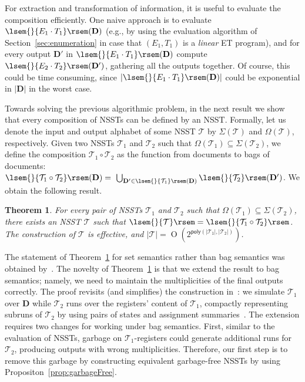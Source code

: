 \documentclass[
a4paper
]{article}
\theoremstyle{plain}
\newtheorem{theorem}{Theorem}[section]
\theoremstyle{definition}
\theoremstyle{remark}
\newcommand{\doc}{\ensuremath{\mathbf{D}}}
\newcommand{\nsst}{\mathcal{T}}
\newcommand{\sem}[1]{{\lsem{}{#1}\rsem}}
\DeclareMathOperator{\bigo}{O}
\begin{document}
For extraction and transformation of information, it is useful to evaluate the composition efficiently. One naive approach
is to evaluate $\sem{E_1 \cdot T_1}(\doc)$
(e.g., by using the evaluation algorithm of Section~\ref{sec:enumeration} in case that $(E_1,T_1)$ is a \emph{linear} ET program),
and for every output $\doc'$ in $\sem{E_1 \cdot T_1}(\doc)$ compute $\sem{E_2 \cdot T_2}(\doc')$, gathering all the outputs together.
Of course, this could be time consuming, since $|\sem{E_1 \cdot T_1}(\doc)|$ could be exponential in $|\doc|$ in the worst case.

Towards solving the previous algorithmic problem, in the next result we show that every composition of NSSTs can be defined by an NSST. Formally, let us denote the input and output alphabet of some NSST $\nsst$ by $\Sigma(\nsst)$ and $\Omega(\nsst)$, respectively.  Given two NSSTs $\nsst_1$ and $\nsst_2$ such that $\Omega(\nsst_1) \subseteq \Sigma(\nsst_2)$, we define the composition $\nsst_1 \circ \nsst_2$ as the function from documents to bags of documents: $\sem{\nsst_1 \circ \nsst_2}(\doc) = \ \bigcup_{\doc' \in \sem{\nsst_1}(\doc)} \sem{\nsst_2}(\doc')$.
We obtain the following result.
\begin{theorem}\label{theo:nsstcomposition}
For every pair of NSSTs $\nsst_1$ and $\nsst_2$ such that $\Omega(\nsst_1) \subseteq \Sigma(\nsst_2)$, there exists an NSST $\nsst$ such that $\sem{\nsst} = \sem{\nsst_1 \circ \nsst_2}$. The construction of $\nsst$ is effective, and $|\nsst| = \bigo(2^{\mathsf{poly(|\nsst_1|, |\nsst_2|)}})$.
\end{theorem}
The statement of Theorem~\ref{theo:nsstcomposition} for set semantics rather than bag semantics was obtained
by~\cite{AlurD11,AlurD22}.
The novelty of
Theorem~\ref{theo:nsstcomposition} is that we extend
the result to bag semantics; namely, we need to maintain the multiplicities of the final outputs correctly. The proof revisits (and simplifies) the construction in~\cite{AlurD11,AlurD22}: we simulate $\nsst_1$ over $\doc$ while $\nsst_2$ runs over the
registers'
content of $\nsst_1$, compactly representing subruns of $\nsst_2$ by using
pairs
of states and assignment summaries~\cite{AlurC10}. The extension requires two changes for working under bag semantics. First, similar to the evaluation of NSSTs, garbage on $\nsst_1$-registers could generate additional runs for $\nsst_2$, producing outputs with wrong multiplicities.
Therefore, our
first step is to remove this garbage
by
constructing equivalent garbage-free NSSTs by using Propositon~\ref{prop:garbageFree}.
\end{document}
